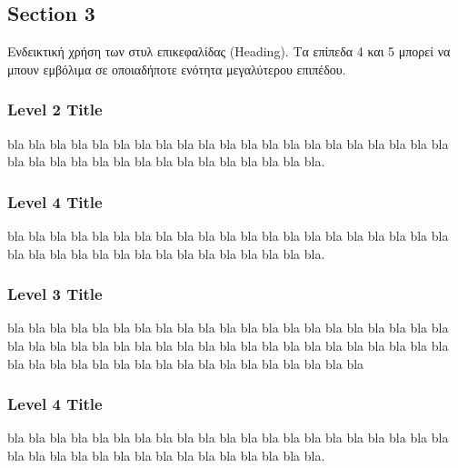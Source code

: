 \subsection{Section 3}

Ενδεικτική χρήση των στυλ επικεφαλίδας (Heading). Τα επίπεδα 4 και 5 μπορεί να μπουν εμβόλιμα σε οποιαδήποτε ενότητα μεγαλύτερου επιπέδου.

\subsubsection{Level 2 Title}

\begin{flushleft}
    bla bla bla bla bla bla bla bla bla bla bla bla bla bla bla bla bla bla bla bla bla bla bla bla bla bla bla bla bla bla bla bla bla bla bla bla. 
\end{flushleft}

\subsubsection*{Level 4 Title}

\begin{flushleft}
    bla bla bla bla bla bla bla bla bla bla bla bla bla bla bla bla bla bla bla bla bla bla bla bla bla bla bla bla bla bla bla bla bla bla bla bla. 
\end{flushleft}

\subsubsection{Level 3 Title}

\begin{flushleft}
    bla bla bla bla bla bla bla bla bla bla bla bla bla bla bla bla bla bla bla bla bla bla bla bla bla bla bla bla bla bla bla bla bla bla bla bla bla bla bla bla bla bla bla bla bla bla bla bla bla bla bla bla bla bla bla bla bla bla bla 
\end{flushleft}

\subsubsection*{Level 4 Title}

\begin{flushleft}
    bla bla bla bla bla bla bla bla bla bla bla bla bla bla bla bla bla bla bla bla bla bla bla bla bla bla bla bla bla bla bla bla bla bla bla bla. 
\end{flushleft}